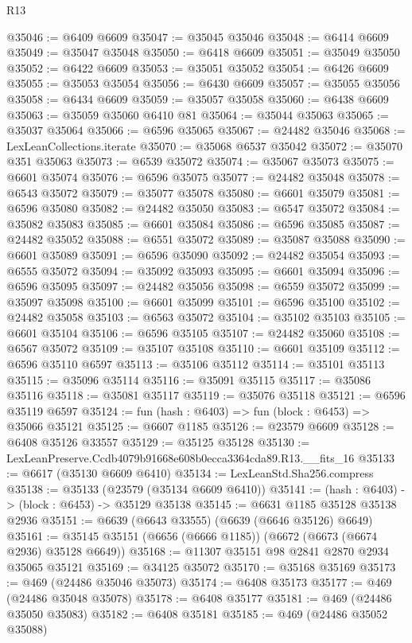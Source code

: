 \begin{lexlean}{R13}
\begin{coremodule}
@35046 := @6409 @6609
@35047 := @35045 @35046
@35048 := @6414 @6609
@35049 := @35047 @35048
@35050 := @6418 @6609
@35051 := @35049 @35050
@35052 := @6422 @6609
@35053 := @35051 @35052
@35054 := @6426 @6609
@35055 := @35053 @35054
@35056 := @6430 @6609
@35057 := @35055 @35056
@35058 := @6434 @6609
@35059 := @35057 @35058
@35060 := @6438 @6609
@35063 := @35059 @35060 @6410 @81
@35064 := @35044 @35063
@35065 := @35037 @35064
@35066 := @6596 @35065
@35067 := @24482 @35046
@35068 := LexLeanCollections.iterate
@35070 := @35068 @6537 @35042
@35072 := @35070 @351 @35063
@35073 := @6539 @35072
@35074 := @35067 @35073
@35075 := @6601 @35074
@35076 := @6596 @35075
@35077 := @24482 @35048
@35078 := @6543 @35072
@35079 := @35077 @35078
@35080 := @6601 @35079
@35081 := @6596 @35080
@35082 := @24482 @35050
@35083 := @6547 @35072
@35084 := @35082 @35083
@35085 := @6601 @35084
@35086 := @6596 @35085
@35087 := @24482 @35052
@35088 := @6551 @35072
@35089 := @35087 @35088
@35090 := @6601 @35089
@35091 := @6596 @35090
@35092 := @24482 @35054
@35093 := @6555 @35072
@35094 := @35092 @35093
@35095 := @6601 @35094
@35096 := @6596 @35095
@35097 := @24482 @35056
@35098 := @6559 @35072
@35099 := @35097 @35098
@35100 := @6601 @35099
@35101 := @6596 @35100
@35102 := @24482 @35058
@35103 := @6563 @35072
@35104 := @35102 @35103
@35105 := @6601 @35104
@35106 := @6596 @35105
@35107 := @24482 @35060
@35108 := @6567 @35072
@35109 := @35107 @35108
@35110 := @6601 @35109
@35112 := @6596 @35110 @6597
@35113 := @35106 @35112
@35114 := @35101 @35113
@35115 := @35096 @35114
@35116 := @35091 @35115
@35117 := @35086 @35116
@35118 := @35081 @35117
@35119 := @35076 @35118
@35121 := @6596 @35119 @6597
@35124 := fun (hash : @6403) => fun (block : @6453) => @35066 @35121
@35125 := @6607 @1185
@35126 := @23579 @6609
@35128 := @6408 @35126 @33557
@35129 := @35125 @35128
@35130 := LexLeanPreserve.Ccdb4079b91668e608b0ecca3364cda89.R13.__fits_16
@35133 := @6617 (@35130 @6609 @6410)
@35134 := LexLeanStd.Sha256.compress
@35138 := @35133 (@23579 (@35134 @6609 @6410))
@35141 := (hash : @6403) -> (block : @6453) -> @35129 @35138
@35145 := @6631 @1185 @35128 @35138 @2936
@35151 := @6639 (@6643 @33555) (@6639 (@6646 @35126) @6649)
@35161 := @35145 @35151 (@6656 (@6666 @1185)) (@6672 (@6673 (@6674 @2936) @35128 @6649))
@35168 := @11307 @35151 @98 @2841 @2870 @2934 @35065 @35121
@35169 := @34125 @35072
@35170 := @35168 @35169
@35173 := @469 (@24486 @35046 @35073)
@35174 := @6408 @35173
@35177 := @469 (@24486 @35048 @35078)
@35178 := @6408 @35177
@35181 := @469 (@24486 @35050 @35083)
@35182 := @6408 @35181
@35185 := @469 (@24486 @35052 @35088)

\end{coremodule}
\end{lexlean}
